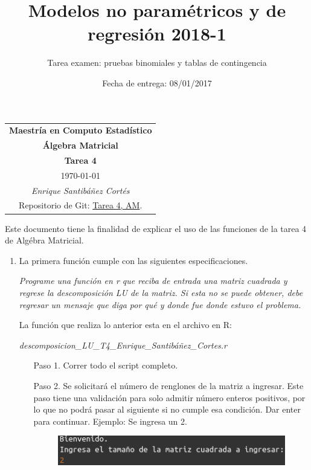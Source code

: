 \documentclass[11pt,letterpaper]{article}
\title{Modelos no paramétricos y de regresión 2018-1}
\author{Tarea examen: pruebas binomiales y tablas de contingencia}
\date{Fecha de entrega: 08/01/2017}
\begin{document}
\begin{table}[ht]
\centering
\begin{tabular}{c}
\textbf{Maestría en Computo Estadístico}\\
\textbf{Álgebra Matricial} \\
\textbf{Tarea 4}\\
\today \\
\emph{Enrique Santibáñez Cortés}\\
Repositorio de Git: \href{https://github.com/Enriquesec/Algebra_matricial/tree/master/tareas/Tarea_4/}{Tarea 4, AM}.
\end{tabular}
\end{table}
Este documento tiene la finalidad de explicar el uso de las funciones de la tarea 4 de Algébra Matricial. 

\begin{enumerate}
\item La primera función cumple con las siguientes especificaciones.

\textit{Programe una función en r que reciba de entrada una matriz cuadrada y regrese la descomposición LU de la matriz. Si esta no se puede obtener, debe regresar un mensaje que diga por qué y donde fue donde estuvo el problema.}

La función que realiza lo anterior esta en el archivo en R:

\textit{descomposicion\_LU\_T4\_Enrique\_Santibáñez\_Cortes.r}

\begin{itemize}
\item[Paso 1.] Correr todo el script completo.

\item[Paso 2.] Se solicitará el número de renglones de la matriz a ingresar. Este paso tiene una validación para solo admitir número enteros positivos, por lo que no podrá pasar al siguiente si no cumple esa condición. Dar enter para continuar. Ejemplo: Se ingresa un 2.
\begin{figure}[H]
\centering
\includegraphics[scale=.7]{paso_2.png}
\end{figure}


\end{itemize}
\end{enumerate}
\end{document}
